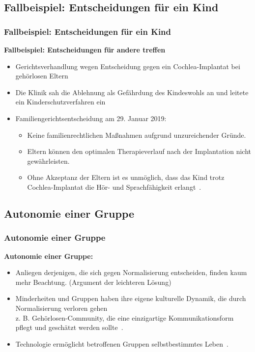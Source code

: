 \documentclass[aspectratio=169,16pt,xcolor=table]{beamer}
\begin{document}
\subsection{Fallbeispiel: Entscheidungen für ein Kind}
\begin{frame}
  \frametitle{Fallbeispiel: Entscheidungen für ein Kind}
  \textbf{Fallbeispiel: Entscheidungen für andere treffen}
  \begin{itemize}
    \item Gerichtsverhandlung wegen Entscheidung gegen ein Cochlea-Implantat bei gehörlosen Eltern~\cite{brde}
    \item Die Klinik sah die Ablehnung als Gefährdung des Kindeswohls an und leitete ein Kinderschutzverfahren ein
    \item Familiengerichtsentscheidung am 29. Januar 2019:
    \begin{itemize}
      \item Keine familienrechtlichen Maßnahmen aufgrund unzureichender Gründe.
      \item Eltern können den optimalen Therapieverlauf nach der Implantation nicht gewährleisten.
      \item Ohne Akzeptanz der Eltern ist es unmöglich, dass das Kind trotz Cochlea-Implantat die Hör- und Sprachfähigkeit erlangt~\cite{brde}.
    \end{itemize}
  \end{itemize}
\end{frame}

\subsection{Autonomie einer Gruppe}
\begin{frame}
  \frametitle{Autonomie einer Gruppe}
  \textbf{Autonomie einer Gruppe:}
  \begin{itemize}
    \item Anliegen derjenigen, die sich gegen Normalisierung entscheiden, finden kaum mehr Beachtung. (Argument der leichteren Lösung)
    \item Minderheiten und Gruppen haben ihre eigene kulturelle Dynamik, die durch Normalisierung verloren gehen\\z. B. Gehörlosen-Community, die eine einzigartige Kommunikationsform pflegt und geschätzt werden sollte~\cite{lee2016cochlear}.
    \item Technologie ermöglicht betroffenen Gruppen selbstbestimmtes Leben~\cite{das2022locked}.
  \end{itemize}
\end{frame}
\end{document}
